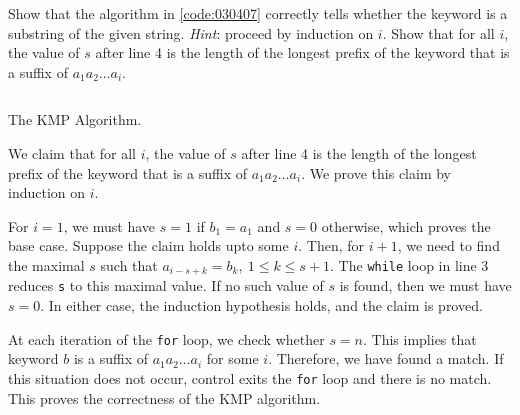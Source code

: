 \begin{exercise}\label{ex:030407}
    Show that the algorithm in \cref{code:030407} correctly tells whether the
    keyword is a substring of the given string. \emph{Hint}: proceed by
    induction on $i$. Show that for all $i$, the value of $s$ after line 4 is
    the length of the longest prefix of the keyword that is a suffix of
    $a_1a_2\ldots a_i$.

    \begin{listing}[!ht]
        \inputminted{c}{03/04/07/ex030407.c}
        \caption{The KMP Algorithm.}
        \label{code:030407}
    \end{listing}
\end{exercise}
\begin{solution}\label{sol:030407} 
    We claim that for all $i$, the value of $s$ after line 4 is the length of
    the longest prefix of the keyword that is a suffix of $a_1a_2\ldots a_i$. We
    prove this claim by induction on $i$.
    
    \noindent For $i = 1$, we must have $s = 1$ if $b_1 = a_1$ and $s = 0$
    otherwise, which proves the base case. Suppose the claim holds upto some
    $i$. Then, for $i + 1$, we need to find the maximal $s$ such that $a_{i-s+k}
    = b_k,\ 1 \le k \le s+1$. The \texttt{while} loop in line 3 reduces
    \texttt{s} to this maximal value. If no such value of $s$ is found, then we
    must have $s = 0$. In either case, the induction hypothesis holds, and the
    claim is proved.

    \noindent At each iteration of the \texttt{for} loop, we check whether $s =
    n$. This implies that keyword $b$ is a suffix of $a_1a_2\ldots a_i$ for some
    $i$. Therefore, we have found a match. If this situation does not occur,
    control exits the \texttt{for} loop and there is no match. This proves the
    correctness of the KMP algorithm.
\end{solution}